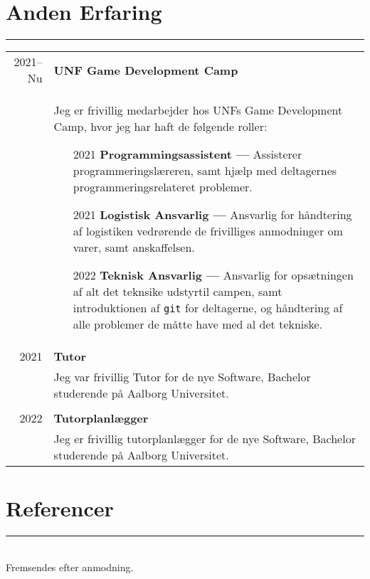 \documentclass{article}
\begin{document}
    \section*{Anden Erfaring}
\hrule width5cm
\begin{longtabu} to \textwidth {r|X}
2021--Nu & \textbf{UNF Game Development Camp}\\
&   Jeg er frivillig medarbejder hos UNFs Game Development Camp, hvor jeg har haft de følgende roller:
    \begin{itemize}\setlength\itemsep{0em}
        \item[2021] \textbf{Programmingsassistent ---} Assisterer programmeringslæreren, samt
            hjælp med deltagernes programmeringsrelateret problemer.
        \item[2021] \textbf{Logistisk Ansvarlig ---} Ansvarlig for håndtering af logistiken
            vedrørende de frivilliges anmodninger om varer, samt anskaffelsen.
        \item[2022] \textbf{Teknisk Ansvarlig ---} Ansvarlig for opsætningen af alt det teknsike
            udstyrtil campen, samt introduktionen af \texttt{git} for deltagerne, og håndtering
            af alle problemer de måtte have med al det tekniske.
    \end{itemize}\\
2021 & \textbf{Tutor}\\
&   Jeg var frivillig Tutor for de nye Software, Bachelor studerende på Aalborg Universitet.\\\\
2022 & \textbf{Tutorplanlægger}\\
&   Jeg er frivillig tutorplanlægger for de nye Software, Bachelor studerende på Aalborg Universitet.
\end{longtabu}

\section*{Referencer}
\hrule width5cm \ \\
Fremsendes efter anmodning.
\end{document}
